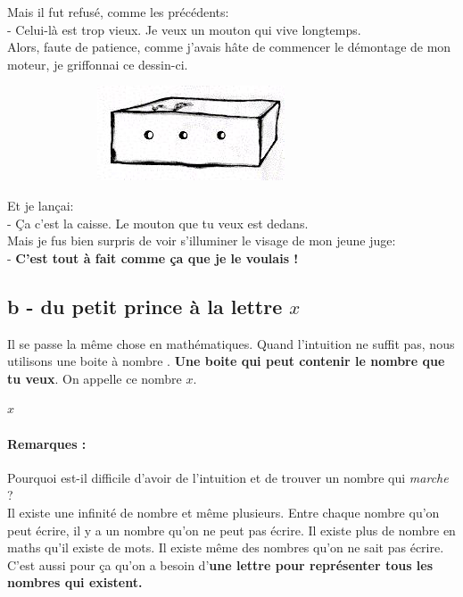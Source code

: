 \documentclass[11pt]{article}
\begin{document}
\begin{multicols}{2}
  Mais il fut refusé, comme les précédents: \\
  - Celui-là est trop vieux. Je veux un mouton qui vive longtemps. \\
  Alors, faute de patience, comme j'avais hâte de commencer le démontage de mon moteur, je griffonnai ce dessin-ci.
  
  \begin{figure}[H]
        \centering
        \includegraphics[width=0.5\linewidth]{3x11-equations/dm-mouton4.png}
  \end{figure}

  Et je lançai: \\
  - Ça c'est la caisse. Le mouton que tu veux est dedans. \\
  Mais je fus bien surpris de voir s'illuminer le visage de mon jeune juge: \\
  - \textbf{C'est tout à fait comme ça que je le voulais ! }
\end{multicols}

\newpage
\subsection*{b - du petit prince à la lettre $x$}

Il se passe la même chose en mathématiques. Quand l'intuition ne suffit pas, nous utilisons une \og boite à nombre \fg. \textbf{Une boite qui peut contenir le nombre que tu veux}. On appelle ce nombre $x$.

\vspace{1cm}
\centerline{\fontsize{102}{102} $x$}
\vspace{1cm}

\paragraph{Remarques : }Pourquoi est-il difficile d'avoir de l'intuition et de trouver un nombre qui \textit{marche} ? \\

Il existe une infinité de nombre et même plusieurs. Entre chaque nombre qu’on peut écrire, il y a un nombre qu’on ne peut pas écrire. Il existe plus de nombre en maths qu’il existe de mots. Il existe même des nombres qu’on ne sait pas écrire. C’est aussi pour ça qu’on a besoin d’\textbf{une lettre pour représenter tous les nombres qui existent.} \\
\end{document}
